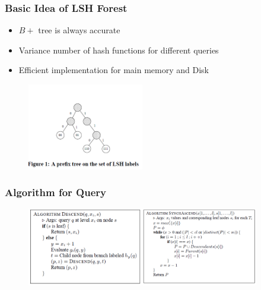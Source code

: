 \begin{frame}
\small
	\frametitle{Basic Idea of LSH Forest\cite{bawa2005lsh}}
	\begin{itemize}
		\item $B+$ tree is always accurate
		\vspace{2ex}
		\item Variance number of hash functions for different queries
		\vspace{2ex}
		\item Efficient implementation for main memory and Disk
	\end{itemize}
\begin{figure}
	\begin{center}
		\includegraphics[width=2in]{figures/forest.png}
	\end{center}
\end{figure}
\end{frame}
\begin{frame}
\frametitle{Algorithm for Query}
\begin{figure}
	\begin{center}
		\includegraphics[width=4in]{figures/alg.png}
	\end{center}
\end{figure}
\end{frame}
